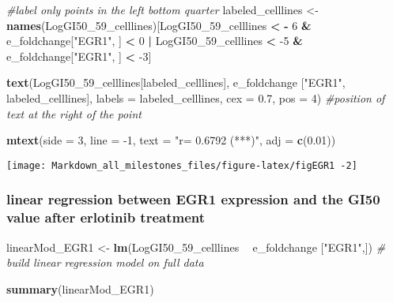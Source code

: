 \documentclass[]{article}
\newenvironment{Shaded}{\begin{snugshade}}{\end{snugshade}}
\newcommand{\CommentTok}[1]{\textcolor[rgb]{0.56,0.35,0.01}{\textit{#1}}}
\newcommand{\DataTypeTok}[1]{\textcolor[rgb]{0.13,0.29,0.53}{#1}}
\newcommand{\DecValTok}[1]{\textcolor[rgb]{0.00,0.00,0.81}{#1}}
\newcommand{\FloatTok}[1]{\textcolor[rgb]{0.00,0.00,0.81}{#1}}
\newcommand{\KeywordTok}[1]{\textcolor[rgb]{0.13,0.29,0.53}{\textbf{#1}}}
\newcommand{\NormalTok}[1]{#1}
\newcommand{\OperatorTok}[1]{\textcolor[rgb]{0.81,0.36,0.00}{\textbf{#1}}}
\newcommand{\StringTok}[1]{\textcolor[rgb]{0.31,0.60,0.02}{#1}}
\begin{document}
\begin{Shaded}
\begin{Highlighting}[]
\CommentTok{#label only points in the left bottom quarter}
\NormalTok{labeled_celllines <-}\StringTok{ }\KeywordTok{names}\NormalTok{(LogGI50_}\DecValTok{59}\NormalTok{_celllines)[LogGI50_}\DecValTok{59}\NormalTok{_celllines }\OperatorTok{<}\StringTok{ }\OperatorTok{-}\StringTok{ }\DecValTok{6}
                                                        \OperatorTok{&}\StringTok{ }\NormalTok{e_foldchange[}\StringTok{"EGR1"}\NormalTok{, ] }\OperatorTok{<}\StringTok{ }\DecValTok{0} 
                                                 \OperatorTok{|}\StringTok{ }\NormalTok{LogGI50_}\DecValTok{59}\NormalTok{_celllines }\OperatorTok{<}\StringTok{ }\DecValTok{-5} 
                                                        \OperatorTok{&}\StringTok{ }\NormalTok{e_foldchange[}\StringTok{"EGR1"}\NormalTok{, ] }\OperatorTok{<}\StringTok{ }\DecValTok{-3}\NormalTok{]}

\KeywordTok{text}\NormalTok{(LogGI50_}\DecValTok{59}\NormalTok{_celllines[labeled_celllines], e_foldchange [}\StringTok{"EGR1"}\NormalTok{, labeled_celllines], }
     \DataTypeTok{labels =}\NormalTok{ labeled_celllines,}
     \DataTypeTok{cex =} \FloatTok{0.7}\NormalTok{,}
     \DataTypeTok{pos =} \DecValTok{4}\NormalTok{) }\CommentTok{#position of text at the right of the point}

\KeywordTok{mtext}\NormalTok{(}\DataTypeTok{side =} \DecValTok{3}\NormalTok{, }\DataTypeTok{line =} \DecValTok{-1}\NormalTok{, }\DataTypeTok{text =} \StringTok{"r= 0.6792 (***)"}\NormalTok{, }\DataTypeTok{adj =} \KeywordTok{c}\NormalTok{(}\FloatTok{0.01}\NormalTok{))}
\end{Highlighting}
\end{Shaded}

\begin{center}\texttt{[image: Markdown\_all\_milestones\_files/figure-latex/figEGR1 -2]} \end{center}

\hypertarget{linear-regression-between-egr1-expression-and-the-gi50-value-after-erlotinib-treatment}{%
\subsubsection{linear regression between EGR1 expression and the GI50
value after erlotinib
treatment}\label{linear-regression-between-egr1-expression-and-the-gi50-value-after-erlotinib-treatment}}

\begin{Shaded}
\begin{Highlighting}[]
\NormalTok{linearMod_EGR1 <-}\StringTok{ }\KeywordTok{lm}\NormalTok{(LogGI50_}\DecValTok{59}\NormalTok{_celllines }\OperatorTok{~}\StringTok{ }\NormalTok{e_foldchange [}\StringTok{"EGR1"}\NormalTok{,])  }\CommentTok{# build linear regression model on full data}

\KeywordTok{summary}\NormalTok{(linearMod_EGR1)}
\end{Highlighting}
\end{Shaded}
\end{document}
